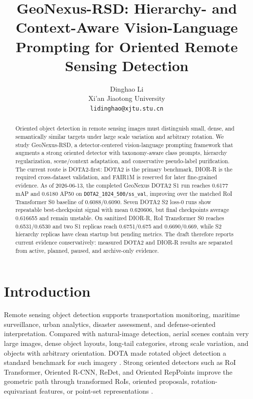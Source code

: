 \documentclass[10pt]{article}
\title{\vspace{-1.2em}GeoNexus-RSD: Hierarchy- and Context-Aware Vision-Language Prompting for Oriented Remote Sensing Detection}
\author{
Dinghao Li\\
Xi'an Jiaotong University\\
\texttt{lidinghao@xjtu.stu.cn}
}
\date{}
\begin{document}
\maketitle
\vspace{-1.4em}

\begin{abstract}
Oriented object detection in remote sensing images must distinguish small, dense, and semantically similar targets under large scale variation and arbitrary rotation. We study GeoNexus-RSD, a detector-centered vision-language prompting framework that augments a strong oriented detector with taxonomy-aware class prompts, hierarchy regularization, scene/context adaptation, and conservative pseudo-label purification. The current route is DOTA2-first: DOTA2 is the primary benchmark, DIOR-R is the required cross-dataset validation, and FAIR1M is reserved for later fine-grained evidence. As of 2026-06-13, the completed GeoNexus DOTA2 S1 run reaches 0.6177 mAP and 0.6180 AP50 on \texttt{DOTA2\_1024\_500/ss\_val}, improving over the matched RoI Transformer S0 baseline of 0.6088/0.6090. Seven DOTA2 S2 loss-0 runs show repeatable best-checkpoint signal with mean 0.620606, but final checkpoints average 0.616655 and remain unstable. On sanitized DIOR-R, RoI Transformer S0 reaches 0.6531/0.6530 and two S1 replicas reach 0.6751/0.675 and 0.6690/0.669, while S2 hierarchy replicas have clean startup but pending metrics. The draft therefore reports current evidence conservatively: measured DOTA2 and DIOR-R results are separated from active, planned, paused, and archive-only evidence.
\end{abstract}

\section{Introduction}

Remote sensing object detection supports transportation monitoring, maritime surveillance, urban analytics, disaster assessment, and defense-oriented interpretation. Compared with natural-image detection, aerial scenes contain very large images, dense object layouts, long-tail categories, strong scale variation, and objects with arbitrary orientation. DOTA made rotated object detection a standard benchmark for such imagery \cite{xia2018dota}. Strong oriented detectors such as RoI Transformer, Oriented R-CNN, ReDet, and Oriented RepPoints improve the geometric path through transformed RoIs, oriented proposals, rotation-equivariant features, or point-set representations \cite{ding2019roit,xie2021orientedrcnn,han2021redet,li2022orientedreppoints}.
\end{document}
